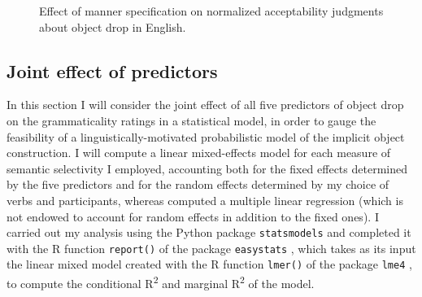 \begin{figure}[htb]
\caption{Effect of manner specification on normalized acceptability judgments about object drop in English.}
    
\end{figure}


\subsection{Joint effect of predictors}  

In this section I will consider the joint effect of all five predictors of object drop on the grammaticality ratings in a statistical model, in order to gauge the feasibility of a linguistically-motivated probabilistic model of the implicit object construction. I will compute a linear mixed-effects model for each measure of semantic selectivity I employed, accounting both for the fixed effects determined by the five predictors and for the random effects determined by my choice of verbs and participants, whereas \textcite[131]{Medina2007} computed a multiple linear regression (which is not endowed to account for random effects in addition to the fixed ones). I carried out my analysis using the Python package \texttt{statsmodels} and completed it with the R function \texttt{report()} of the package \texttt{easystats} \parencite{r_report}, which takes as its input the linear mixed model created with the R function \texttt{lmer()} of the package \texttt{lme4} \parencite{r_lmer}, to compute the conditional R\textsuperscript{2} and marginal R\textsuperscript{2} of the model.\\
